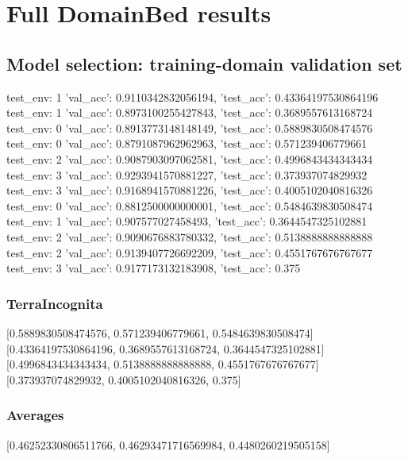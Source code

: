 \documentclass{article}
\begin{document}
\section{Full DomainBed results}

\subsection{Model selection: training-domain validation set}
test_env: 1
{'val_acc': 0.9110342832056194, 'test_acc': 0.43364197530864196}
test_env: 1
{'val_acc': 0.8973100255427843, 'test_acc': 0.3689557613168724}
test_env: 0
{'val_acc': 0.8913773148148149, 'test_acc': 0.5889830508474576}
test_env: 0
{'val_acc': 0.8791087962962963, 'test_acc': 0.571239406779661}
test_env: 2
{'val_acc': 0.9087903097062581, 'test_acc': 0.4996843434343434}
test_env: 3
{'val_acc': 0.9293941570881227, 'test_acc': 0.373937074829932}
test_env: 3
{'val_acc': 0.9168941570881226, 'test_acc': 0.4005102040816326}
test_env: 0
{'val_acc': 0.8812500000000001, 'test_acc': 0.5484639830508474}
test_env: 1
{'val_acc': 0.907577027458493, 'test_acc': 0.3644547325102881}
test_env: 2
{'val_acc': 0.9090676883780332, 'test_acc': 0.5138888888888888}
test_env: 2
{'val_acc': 0.9139407726692209, 'test_acc': 0.4551767676767677}
test_env: 3
{'val_acc': 0.9177173132183908, 'test_acc': 0.375}

\subsubsection{TerraIncognita}
[0.5889830508474576, 0.571239406779661, 0.5484639830508474]
[0.43364197530864196, 0.3689557613168724, 0.3644547325102881]
[0.4996843434343434, 0.5138888888888888, 0.4551767676767677]
[0.373937074829932, 0.4005102040816326, 0.375]

\begin{center}
\end{center}

\subsubsection{Averages}
[0.46252330806511766, 0.46293471716569984, 0.4480260219505158]

\begin{center}
\end{center}
\end{document}
